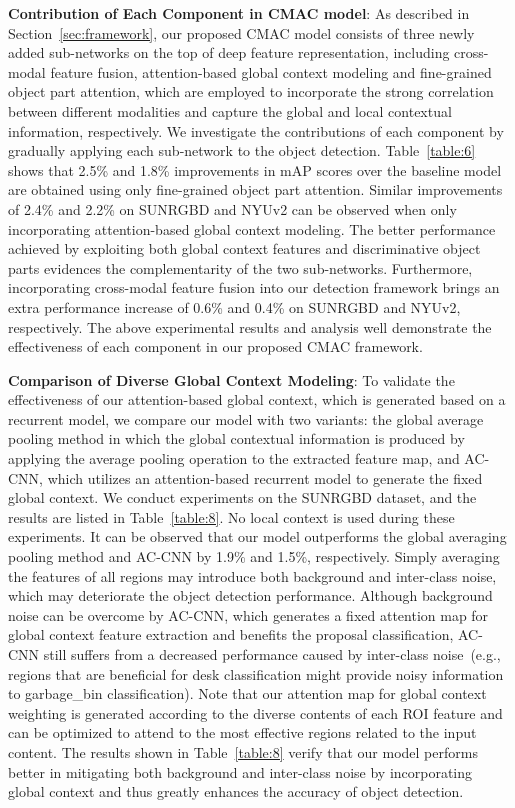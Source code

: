 \documentclass[journal]{IEEEtran}
\begin{document}
\textbf{Contribution of Each Component in CMAC model}: As described in Section~\ref{sec:framework}, our proposed CMAC model
consists of three newly added sub-networks on the top of deep feature representation, including cross-modal feature fusion, attention-based global context modeling and fine-grained  object part attention, which are employed to incorporate the strong correlation between different modalities and capture the global and local contextual information, respectively. We investigate the contributions of each component by gradually applying each sub-network to the object detection.  Table~\ref{table:6} shows that 2.5\% and 1.8\% improvements in mAP scores over the baseline model are obtained using only fine-grained object part attention. Similar improvements of 2.4\% and 2.2\% on SUNRGBD and NYUv2 can be observed when only incorporating attention-based global context modeling. The better performance achieved by exploiting both global context features and discriminative object parts evidences the complementarity of the two sub-networks. Furthermore, incorporating cross-modal feature fusion into our detection framework brings an extra performance increase of 0.6\% and 0.4\% on SUNRGBD and NYUv2, respectively. The above experimental results and analysis well demonstrate the effectiveness of  each component in our proposed CMAC framework.

\textbf{Comparison of Diverse Global Context Modeling}: To validate the effectiveness of our attention-based global context, which is generated based on a recurrent model, we compare our model with two variants: the global average pooling method in which the global contextual information is produced by applying the average pooling operation to the extracted feature map, and AC-CNN, which utilizes an attention-based recurrent model to generate the fixed global context. We conduct experiments on the SUNRGBD dataset, and the results are listed in Table~\ref{table:8}. No local context is used during these experiments. It can be observed that our model outperforms the global averaging pooling method and AC-CNN by 1.9\% and 1.5\%, respectively. Simply averaging the features of all regions may introduce both background and inter-class noise, which may deteriorate the object detection performance. Although background noise can be overcome by AC-CNN, which generates a fixed attention map for global context feature extraction and benefits the proposal classification, AC-CNN still suffers from a decreased performance caused by inter-class noise~(e.g., regions that are beneficial for desk classification might provide noisy information to garbage\_bin classification). Note that our attention map for global context weighting is generated according to the diverse contents of each  ROI feature and can be optimized to attend to the most effective regions related to the input content. The results shown in Table~\ref{table:8} verify that our model performs better in mitigating both background and inter-class noise by incorporating global context and thus greatly enhances the accuracy of object detection.
\end{document}
